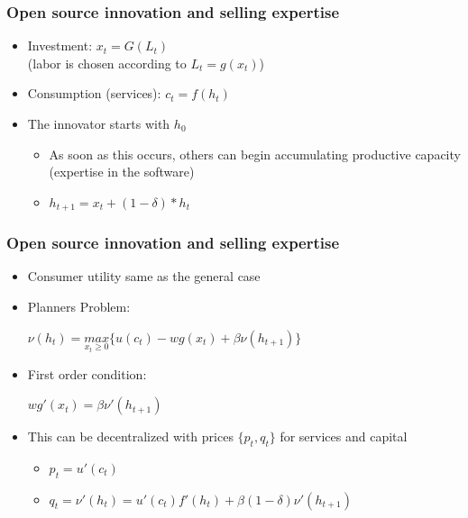 \documentclass{beamer}
\begin{document}
\begin{frame}[t]
  \frametitle{Open source innovation and selling expertise}
  \begin{itemize}
    \item<+-> Investment: $x_t = G(L_t)$\\ (labor is chosen according to $L_t = g(x_t)$)
    \item<+-> Consumption (services): $c_t = f(h_t)$
    \item<+-> The innovator starts with $h_0$
    \begin{itemize}
      \item<+-> As soon as this occurs, others can begin accumulating productive capacity (expertise in the software)
      \item<+-> $h_{t+1} = x_t + (1-\delta)*h_t$
    \end{itemize}
  \end{itemize}
\end{frame}

\begin{frame}[t]\frametitle{Open source innovation and selling expertise}
  \begin{itemize}
    \item<+-> Consumer utility same as the general case
    \item<+-> Planners Problem:\\ 
    \begin{centering}
      $\nu(h_t) = \underset{x_t \ge 0}{max} \{u(c_t) - wg(x_t) + \beta\nu(h_{t+1})\}$
    \end{centering}
    \item<+-> First order condition:\\
    \begin{centering}
      $wg'(x_t) = \beta\nu'(h_{t+1})$
    \end{centering}
    \item<+-> This can be decentralized with prices $\{p_t, q_t\}$ for services and capital
    \begin{itemize}
    \item<+-> $p_t = u'(c_t)$
    \item<+-> $q_t = \nu'(h_t) = u'(c_t)f'(h_t) + \beta(1-\delta)\nu'(h_{t+1})$ 
    \end{itemize} 
  \end{itemize}
\end{frame}
\end{document}
